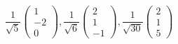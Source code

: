 \documentclass[12pt]{ujarticle}
\begin{document}
\[
\frac{1}{\sqrt{5}} \left(
  \begin{array}{c}
  1 \\
  -2 \\
  0
  \end{array}
  \right),
\frac{1}{\sqrt{6}} \left(
  \begin{array}{c}
  2 \\
  1 \\
  -1
  \end{array}
  \right),
\frac{1}{\sqrt{30}} \left(
  \begin{array}{c}
  2 \\
  1 \\
  5
  \end{array}
  \right)
\]
\end{document}

